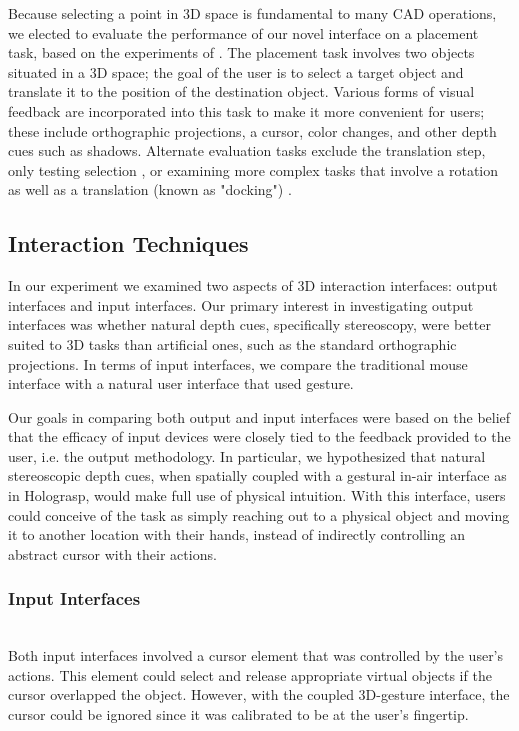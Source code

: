 \documentclass[pageno]{jpaper}
\begin{document}
Because selecting a point in 3D space is fundamental to many CAD operations, we elected to 
evaluate the performance of our novel interface on a placement task, based on the experiments
of \cite{study1, study2}. The placement task involves two objects situated in a 3D space; the
goal of the user is to select a target object and translate it to the position of the
destination object. Various forms of visual feedback are incorporated into this task to
make it more convenient for users; these include orthographic projections, a cursor, color
changes, and other depth cues such as shadows. Alternate evaluation tasks exclude the
translation step, only testing selection \cite{holodesk}, or examining more complex tasks
that involve a rotation as well as a translation (known as "docking") \cite{masliah2000measuring}.

\subsection{Interaction Techniques}
In our experiment we examined two aspects of 3D interaction interfaces: output interfaces and
input interfaces. Our primary interest in investigating output interfaces was whether natural depth cues,
specifically stereoscopy, were better suited to 3D tasks than artificial ones, such as the
standard orthographic projections. In terms of input interfaces, we compare the traditional 
mouse interface with a natural user interface that used gesture. 

Our goals in comparing both output and input interfaces were based on the belief that the
efficacy of input devices were closely tied to the feedback provided to the user, i.e. the
output methodology. In particular, we hypothesized that natural stereoscopic
depth cues, when spatially coupled with a gestural in-air interface as in Holograsp, would make full use of
physical intuition. With this interface, users could conceive of the task as simply reaching
out to a physical object and moving it to another location with their hands, instead of
indirectly controlling an abstract cursor with their actions.

\subsubsection{Input Interfaces}$ $\\
Both input interfaces involved a cursor element that was controlled by the user's actions. This
element could select and release appropriate virtual objects if the cursor overlapped the object.
However, with the coupled 3D-gesture interface, the cursor could be ignored since it was
calibrated to be at the user's fingertip.
\end{document}
